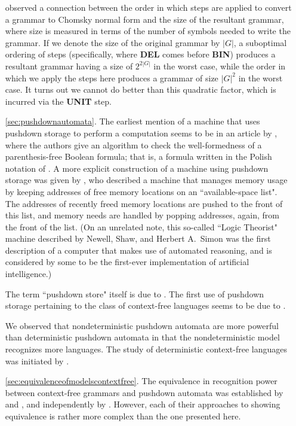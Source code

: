 \begin{enumerate}
\citet{LangeLeiss2009EfficientCNF} observed a connection between the order in which steps are applied to convert a grammar to Chomsky normal form and the size of the resultant grammar, where size is measured in terms of the number of symbols needed to write the grammar. If we denote the size of the original grammar by $|G|$, a suboptimal ordering of steps (specifically, where \textbf{DEL} comes before \textbf{BIN}) produces a resultant grammar having a size of $2^{2|G|}$ in the worst case, while the order in which we apply the steps here produces a grammar of size $|G|^{2}$ in the worst case. It turns out we cannot do better than this quadratic factor, which is incurred via the \textbf{UNIT} step.

\item[\ref{sec:pushdownautomata}.] The earliest mention of a machine that uses pushdown storage to perform a computation seems to be in an article by \citet*{Burks1954AnalysisLogicalMachine}, where the authors give an algorithm to check the well-formedness of a parenthesis-free Boolean formula; that is, a formula written in the Polish notation of \citet{Lukasiewicz1929MathematicalLogic}. A more explicit construction of a machine using pushdown storage was given by \citet{NewellShaw1957ProgrammingLogicTheoryMachine}, who described a machine that manages memory usage by keeping addresses of free memory locations on an ``available-space list". The addresses of recently freed memory locations are pushed to the front of this list, and memory needs are handled by popping addresses, again, from the front of the list. (On an unrelated note, this so-called ``Logic Theorist" machine described by Newell, Shaw, and Herbert A.\ Simon was the first description of a computer that makes use of automated reasoning, and is considered by some to be the first-ever implementation of artificial intelligence.)

The term ``pushdown store" itself is due to \citet{Oettinger1961AutomaticSyntacticAnalysis}. The first use of pushdown storage pertaining to the class of context-free languages seems to be due to \citet{Chomsky1962CFGsPushdownStorage}.

We observed that nondeterministic pushdown automata are more powerful than deterministic pushdown automata in that the nondeterministic model recognizes more languages. The study of deterministic context-free languages was initiated by \citet{Ginsburg1966DCFLs}.

\item[\ref{sec:equivalenceofmodelscontextfree}.] The equivalence in recognition power between context-free grammars and pushdown automata was established by \citet{Chomsky1962CFGsPushdownStorage} and \citet{ChomskySchutzenberger1963ContextFree}, and independently by \citet{Evey1963ApplicationsPushdownStore, Evey1963PhDThesis}. However, each of their approaches to showing equivalence is rather more complex than the one presented here.


\end{enumerate}

